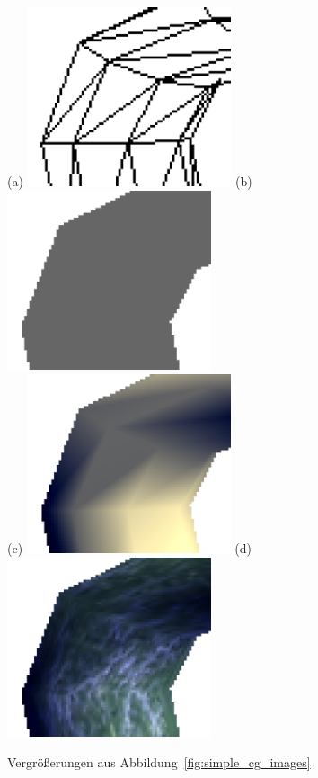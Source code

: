\documentclass[twoside,a4paper,fleqn,12pt]{book}
\begin{document}
\begin{figure}[h]
  \centering
  (a) \includegraphics[width=6cm]{simple_s1_crop_large_wire}\qquad
  (b) \includegraphics[width=6cm]{simple_s1_crop_large_mesh}\\
  \vspace{1em}
  (c) \includegraphics[width=6cm]{simple_s1_crop_large_vert}\qquad
  (d) \includegraphics[width=6cm]{simple_s1_crop_large_frag}
  \caption{Vergrößerungen aus Abbildung~\ref{fig:simple_cg_images}}
  \label{fig:simple_cg_images_large}
\end{figure}
\end{document}
